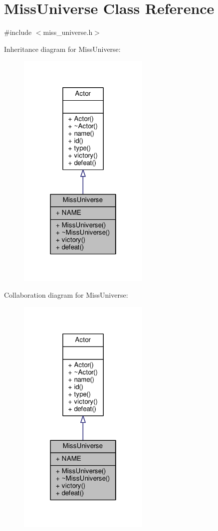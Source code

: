 \hypertarget{classMissUniverse}{}\section{Miss\+Universe Class Reference}
\label{classMissUniverse}


{\ttfamily \#include $<$miss\+\_\+universe.\+h$>$}



Inheritance diagram for Miss\+Universe\+:
\nopagebreak
\begin{figure}[H]
\begin{center}
\leavevmode
\includegraphics[width=178pt]{classMissUniverse__inherit__graph}
\end{center}
\end{figure}


Collaboration diagram for Miss\+Universe\+:
\nopagebreak
\begin{figure}[H]
\begin{center}
\leavevmode
\includegraphics[width=178pt]{classMissUniverse__coll__graph}
\end{center}
\end{figure}
